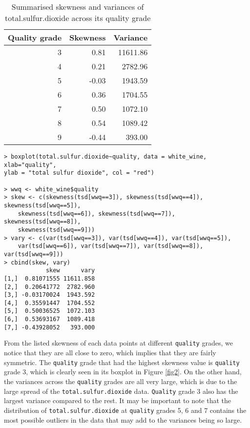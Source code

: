 \documentclass[11pt,a4]{article}
\begin{document}
\begin{table}[ht]
\centering
\begin{tabular}{rrr}
  \hline
 Quality grade & Skewness & Variance \\ 
  \hline
3 & 0.81 & 11611.86 \\ 
  4 & 0.21 & 2782.96 \\ 
  5 & -0.03 & 1943.59 \\ 
  6 & 0.36 & 1704.55 \\ 
  7 & 0.50 & 1072.10 \\ 
  8 & 0.54 & 1089.42 \\ 
  9 & -0.44 & 393.00 \\ 
   \hline
\end{tabular}
\caption{Summarised skewness and variances of total.sulfur.dioxide across its quality grade}
\label{tab2}
\end{table}

\begin{verbatim}
> boxplot(total.sulfur.dioxide~quality, data = white_wine, xlab="quality", 
ylab = "total sulfur dioxide", col = "red")

> wwq <- white_wine$quality
> skew <- c(skewness(tsd[wwq==3]), skewness(tsd[wwq==4]), skewness(tsd[wwq==5]),
    skewness(tsd[wwq==6]), skewness(tsd[wwq==7]), skewness(tsd[wwq==8]), 
    skewness(tsd[wwq==9]))
> vary <- c(var(tsd[wwq==3]), var(tsd[wwq==4]), var(tsd[wwq==5]), 
    var(tsd[wwq==6]), var(tsd[wwq==7]), var(tsd[wwq==8]), var(tsd[wwq==9]))
> cbind(skew, vary)
            skew      vary
[1,]  0.81071555 11611.858
[2,]  0.20641772  2782.960
[3,] -0.03170024  1943.592
[4,]  0.35591447  1704.552
[5,]  0.50036525  1072.103
[6,]  0.53693167  1089.418
[7,] -0.43928052   393.000
\end{verbatim}

From the listed skewness of each data points at different \verb|quality| grades, we notice that they are all close to zero, which implies that they are fairly symmetric. The \verb|quality| grade that had the highest skewness value is \verb|quality| grade 3, which is clearly seen in its boxplot in Figure \ref{fig2}. On the other hand, the variances across the \verb|quality| grades are all very large, which is due to the large spread of the \verb|total.sulfur.dioxide| data. \verb|Quality| grade 3 also has the largest variance compared to the rest. It may be important to note that the distribution of \verb|total.sulfur.dioxide| at \verb|quality| grades 5, 6 and 7 contains the most possible outliers in the data that may add to the variances being so large.
\end{document}

